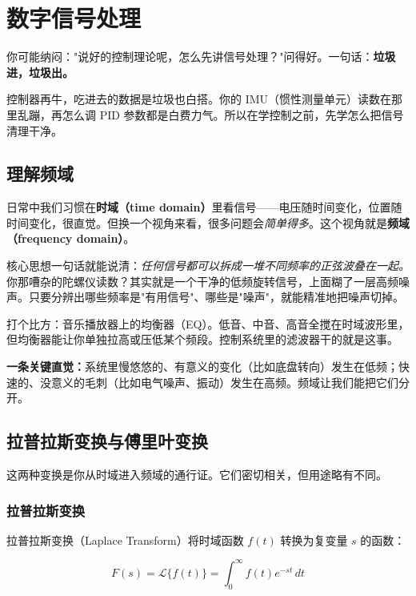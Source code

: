 \section{数字信号处理}

你可能纳闷："说好的控制理论呢，怎么先讲信号处理？"问得好。一句话：\textbf{垃圾进，垃圾出。}

控制器再牛，吃进去的数据是垃圾也白搭。你的 IMU（惯性测量单元）读数在那里乱蹦，再怎么调 PID 参数都是白费力气。所以在学控制之前，先学怎么把信号清理干净。

\subsection{理解频域}

日常中我们习惯在\textbf{时域（time domain）}里看信号——电压随时间变化，位置随时间变化，很直觉。但换一个视角来看，很多问题会\textit{简单得多}。这个视角就是\textbf{频域（frequency domain）}。

核心思想一句话就能说清：\textit{任何信号都可以拆成一堆不同频率的正弦波叠在一起。}你那嘈杂的陀螺仪读数？其实就是一个干净的低频旋转信号，上面糊了一层高频噪声。只要分辨出哪些频率是"有用信号"、哪些是"噪声"，就能精准地把噪声切掉。

打个比方：音乐播放器上的均衡器（EQ）。低音、中音、高音全搅在时域波形里，但均衡器能让你单独拉高或压低某个频段。控制系统里的滤波器干的就是这事。

\textbf{一条关键直觉：}系统里慢悠悠的、有意义的变化（比如底盘转向）发生在低频；快速的、没意义的毛刺（比如电气噪声、振动）发生在高频。频域让我们能把它们分开。

\subsection{拉普拉斯变换与傅里叶变换}

这两种变换是你从时域进入频域的通行证。它们密切相关，但用途略有不同。

\subsubsection{拉普拉斯变换}

拉普拉斯变换（Laplace Transform）将时域函数 $f(t)$ 转换为复变量 $s$ 的函数：

\begin{equation}
F(s) = \mathcal{L}\{f(t)\} = \int_0^{\infty} f(t) e^{-st} \, dt
\end{equation}

